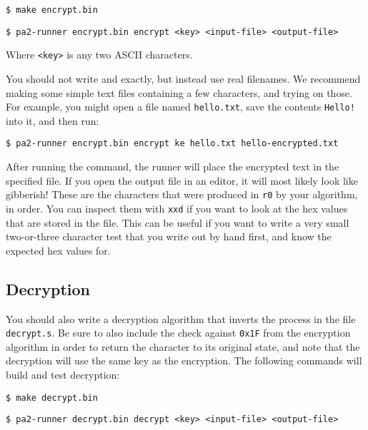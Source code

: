 \documentclass{article}
\def\r#1{\texttt{r#1}}
\begin{document}
\begin{verbatim}
$ make encrypt.bin
\end{verbatim}

\begin{verbatim}
$ pa2-runner encrypt.bin encrypt <key> <input-file> <output-file>
\end{verbatim}

Where {\tt <key>} is any two ASCII characters.

You should not write {\tt <input-file>} and {\tt <output-file>} exactly, but
instead use real filenames. We recommend making some simple text files
containing a few characters, and trying on those. For example, you might open a
file named {\tt hello.txt}, save the contents {\tt Hello!} into it, and then
run:

\begin{verbatim}
$ pa2-runner encrypt.bin encrypt ke hello.txt hello-encrypted.txt
\end{verbatim}

After running the command, the runner will place the encrypted text in the
specified file. If you open the output file in an editor, it will most likely
look like gibberish! These are the characters that were produced in \r{0} by
your algorithm, in order. You can inspect them with {\tt xxd} if you want to
look at the hex values that are stored in the file. This can be useful if you
want to write a very small two-or-three character test that you write out by
hand first, and know the expected hex values for.

\subsection{Decryption}

You should also write a decryption algorithm that inverts the process in the
file \texttt{decrypt.s}. Be sure to also include the check against {\tt 0x1F} 
from the encryption algorithm in order to return the character to its original
state, and note that the decryption will use the same key as the encryption. 
The following commands will build and test decryption:

\begin{verbatim}
$ make decrypt.bin
\end{verbatim}

\begin{verbatim}
$ pa2-runner decrypt.bin decrypt <key> <input-file> <output-file>
\end{verbatim}
\end{document}

